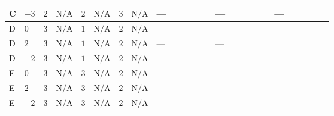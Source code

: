 \documentclass[8pt]{article}
\begin{document}
\begin{landscape}
\begin{longtable}{@{}llcccccc >{\raggedright\arraybackslash}p{0.21\linewidth} >{\raggedright\arraybackslash}p{0.21\linewidth} >{\raggedright\arraybackslash}p{0.21\linewidth}@{}}
\midrule
C & $-3$ & $2$ & $\text{N/A}$ & $2$ & $\text{N/A}$ & $3$ & $\text{N/A}$ & --- & --- & --- \\
\midrule
D & $0$ & $3$ & $\text{N/A}$ & $1$ & $\text{N/A}$ & $2$ & $\text{N/A}$ & \scriptsize\adjustbox{max width=\linewidth}{$\begin{gathered} +\frac{352}{3} {\lambda_{X_{9}}} \left({\lambda_{X_{9}}}\right)^{*}\end{gathered}$} & \scriptsize\adjustbox{max width=\linewidth}{$\begin{gathered} +\frac{16}{3} {\lambda_{X_{18}}} \left({\lambda_{X_{18}}}\right)^{*}\end{gathered}$} & \scriptsize\adjustbox{max width=\linewidth}{$\begin{gathered} +22 {g_2}^4\end{gathered}$} \\
\midrule
D & $2$ & $3$ & $\text{N/A}$ & $1$ & $\text{N/A}$ & $2$ & $\text{N/A}$ & --- & --- & \scriptsize\adjustbox{max width=\linewidth}{$\begin{gathered} 22 {g_2}^4\end{gathered}$} \\
\midrule
D & $-2$ & $3$ & $\text{N/A}$ & $1$ & $\text{N/A}$ & $2$ & $\text{N/A}$ & --- & --- & \scriptsize\adjustbox{max width=\linewidth}{$\begin{gathered} +22 {g_2}^4\end{gathered}$} \\
\midrule
E & $0$ & $3$ & $\text{N/A}$ & $3$ & $\text{N/A}$ & $2$ & $\text{N/A}$ & \scriptsize\adjustbox{max width=\linewidth}{$\begin{gathered} +\frac{352}{3} {\lambda_{X_{9}}} \left({\lambda_{X_{9}}}\right)^{*}\end{gathered}$} & \scriptsize\adjustbox{max width=\linewidth}{$\begin{gathered} +\frac{16}{3} {\lambda_{X_{18}}} \left({\lambda_{X_{18}}}\right)^{*}\end{gathered}$} & \scriptsize\adjustbox{max width=\linewidth}{$\begin{gathered} +22 {g_2}^4\end{gathered}$} \\
\midrule
E & $2$ & $3$ & $\text{N/A}$ & $3$ & $\text{N/A}$ & $2$ & $\text{N/A}$ & --- & --- & \scriptsize\adjustbox{max width=\linewidth}{$\begin{gathered} 22 {g_2}^4\end{gathered}$} \\
\midrule
E & $-2$ & $3$ & $\text{N/A}$ & $3$ & $\text{N/A}$ & $2$ & $\text{N/A}$ & --- & --- & \scriptsize\adjustbox{max width=\linewidth}{$\begin{gathered} +22 {g_2}^4\end{gathered}$} \\

\end{longtable}
\end{landscape}
\end{document}

